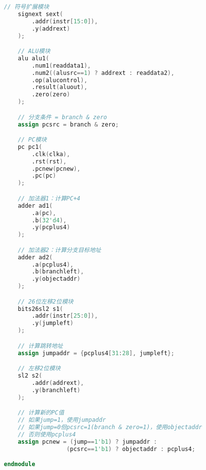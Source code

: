\begin{lstlisting}[language=Verilog]
    // 符号扩展模块
    signext sext(
        .addr(instr[15:0]),
        .y(addrext)
    );

    // ALU模块
    alu alu1(
        .num1(readdata1),
        .num2((alusrc==1) ? addrext : readdata2),
        .op(alucontrol),
        .result(aluout),
        .zero(zero)
    );

    // 分支条件 = branch & zero
    assign pcsrc = branch & zero;

    // PC模块
    pc pc1(
        .clk(clka),
        .rst(rst),
        .pcnew(pcnew),
        .pc(pc)
    );

    // 加法器1：计算PC+4
    adder ad1(
        .a(pc),
        .b(32'd4),
        .y(pcplus4)
    );

    // 加法器2：计算分支目标地址
    adder ad2(
        .a(pcplus4),
        .b(branchleft),
        .y(objectaddr)
    );

    // 26位左移2位模块
    bits26sl2 s1(
        .addr(instr[25:0]),
        .y(jumpleft)
    );

    // 计算跳转地址
    assign jumpaddr = {pcplus4[31:28], jumpleft};

    // 左移2位模块
    sl2 s2(
        .addr(addrext),
        .y(branchleft)
    );

    // 计算新的PC值
    // 如果jump=1，使用jumpaddr
    // 如果jump=0但pcsrc=1(branch & zero=1)，使用objectaddr
    // 否则使用pcplus4
    assign pcnew = (jump==1'b1) ? jumpaddr : 
                  (pcsrc==1'b1) ? objectaddr : pcplus4;

endmodule
\end{lstlisting}
